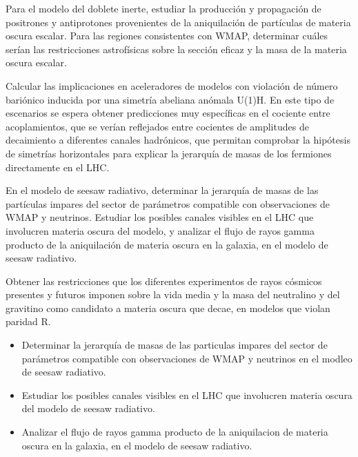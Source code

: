 \begin{ideas}
  \newpage{}

Para el modelo del doblete inerte, estudiar la producción y propagación de positrones y antiprotones  provenientes de  la aniquilación de partículas de materia oscura escalar. Para las regiones consistentes con WMAP, determinar cuáles serían las restricciones astrofísicas sobre la sección eficaz y la masa de la materia oscura escalar.  

Calcular las implicaciones en aceleradores de modelos con violación de número bariónico inducida por una simetría abeliana anómala U(1)H. En este tipo de escenarios se espera obtener predicciones muy específicas en el cociente entre acoplamientos, que se verían reflejados entre cocientes de amplitudes de decaimiento a diferentes canales hadrónicos, que permitan comprobar la hipótesis de simetrías horizontales para explicar la jerarquía de masas de los fermiones directamente en el LHC. 

En el modelo de seesaw radiativo, determinar la jerarquía de masas de las partículas impares del sector de parámetros compatible con observaciones de WMAP y neutrinos. Estudiar los posibles canales visibles en el LHC que involucren materia oscura del modelo, y analizar el flujo de rayos gamma producto de la aniquilación de materia oscura en la galaxia, en el modelo de seesaw radiativo.

Obtener las restricciones que los diferentes experimentos de rayos cósmicos 
presentes y futuros imponen sobre la vida media y la masa del neutralino y del gravitino como 
candidato a materia oscura que decae, en modelos que violan paridad R.


\begin{itemize}
 \item Determinar la jerarquía de masas de las particulas impares del sector de parámetros compatible con observaciones de WMAP y neutrinos en el modleo de seesaw radiativo.
 \item Estudiar los posibles canales visibles en el LHC que involucren materia oscura del modelo de seesaw radiativo.
 \item Analizar el flujo de rayos gamma producto de la aniquilacion de materia oscura en la galaxia, en el modelo de seesaw radiativo.
\end{itemize}


\end{ideas}
